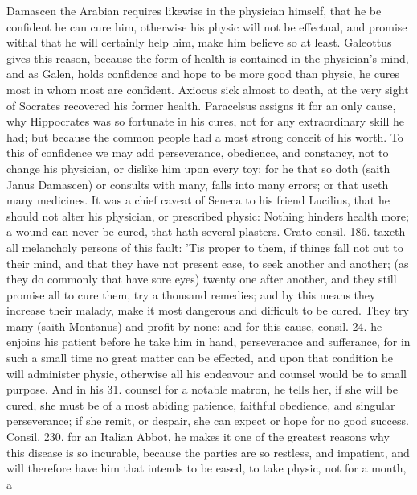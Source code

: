 {Damascen the Arabian requires likewise in the physician himself,
that he be confident he can cure him, otherwise his physic will not be
effectual, and promise withal that he will certainly help him, make him
believe so at least. Galeottus gives this reason, because the
form of health is contained in the physician's mind, and as Galen,
holds confidence and hope to be more good than physic, he cures
most in whom most are confident. Axiocus sick almost to death, at the
very sight of Socrates recovered his former health. Paracelsus assigns
it for an only cause, why Hippocrates was so fortunate in his cures,
not for any extraordinary skill he had; but because the common
people had a most strong conceit of his worth. To this of confidence we
may add perseverance, obedience, and constancy, not to change his
physician, or dislike him upon every toy; for he that so doth (saith
Janus Damascen) or consults with many, falls into many errors; or
that useth many medicines. It was a chief caveat of Seneca to his
friend Lucilius, that he should not alter his physician, or prescribed
physic: Nothing hinders health more; a wound can never be cured, that
hath several plasters. Crato consil. 186. taxeth all melancholy persons
of this fault: 'Tis proper to them, if things fall not out to
their mind, and that they have not present ease, to seek another and
another; (as they do commonly that have sore eyes) twenty one after
another, and they still promise all to cure them, try a thousand
remedies; and by this means they increase their malady, make it most
dangerous and difficult to be cured. They try many (saith 
Montanus) and profit by none: and for this cause, consil. 24. he
enjoins his patient before he take him in hand, perseverance and
sufferance, for in such a small time no great matter can be effected,
and upon that condition he will administer physic, otherwise all his
endeavour and counsel would be to small purpose. And in his 31. counsel
for a notable matron, he tells her, if she will be cured, she
must be of a most abiding patience, faithful obedience, and singular
perseverance; if she remit, or despair, she can expect or hope for no
good success. Consil. 230. for an Italian Abbot, he makes it one of the
greatest reasons why this disease is so incurable, because the
parties are so restless, and impatient, and will therefore have him
that intends to be eased, to take physic, not for a month, a
}
